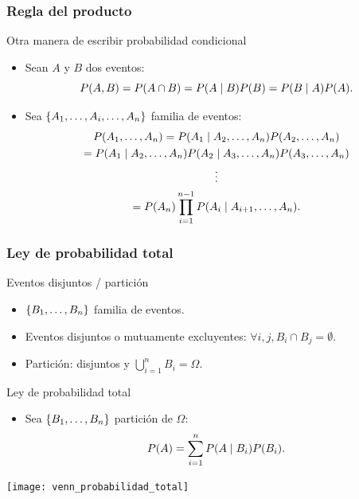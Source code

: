 \documentclass[table]{beamer}
\begin{document}
\begin{frame}
    \frametitle{Regla del producto}
    \begin{block}{Otra manera de escribir probabilidad condicional}
        \begin{itemize}
            \item Sean $A$ y $B$ dos eventos:
                \begin{equation*}
                    \prob{A, B} = \prob{A \cap B} = \prob{A \mid B} \prob{B} = \prob{B \mid A} \prob{A} .
                \end{equation*}
            \item Sea $\bparens{A_{1}, \ldots , A_{i}, \ldots, A_{n}}$ familia de eventos:
                \begin{multline*}
                    \prob{A_{1}, \ldots , A_{n}}
                    = \prob{A_{1} \mid A_{2} , \ldots, A_{n}} \prob{A_{2}, \ldots, A_{n}}
                    \\
                    = \prob{A_{1} \mid A_{2} , \ldots, A_{n}} \prob{A_{2} \mid A_{3}, \ldots, A_{n}} \prob{A_{3} , \ldots, A_{n}}
                    \\
                    \vdots
                    \\
                    = \prob{A_{n}} \prod_{i = 1}^{n - 1} \prob{A_{i} \mid A_{i + 1} , \ldots, A_{n}}.
                \end{multline*}
        \end{itemize}
    \end{block}
\end{frame}

\begin{frame}
    \frametitle{Ley de probabilidad total}
    \begin{block}{Eventos disjuntos / partición}
        \begin{itemize}
            \item $\bparens{B_{1}, \ldots, B_{n}}$ familia de eventos.
            \item Eventos disjuntos o mutuamente excluyentes: $\forall i, j, B_{i} \cap B_{j} = \emptyset$.
            \item Partición: disjuntos y $\bigcup_{i = 1}^{n} B_{i} = \Omega$.
        \end{itemize}
    \end{block}
    \begin{block}{Ley de probabilidad total}
        \begin{itemize}
            \item Sea $\bparens{B_{1}, \ldots, B_{n}}$ partición de $\Omega$:
                \begin{equation*}
                    \prob{A} = \sum_{i = 1}^{n} \prob{A \mid B_{i}} \prob{B_{i}} .
                \end{equation*}
        \end{itemize}
    \end{block}
    \begin{center}
        \texttt{[image: venn\_probabilidad\_total]}
    \end{center}
\end{frame}
\end{document}
